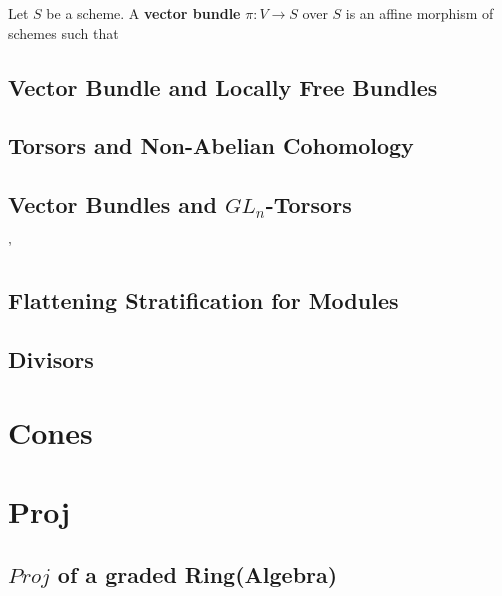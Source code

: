\documentclass[Total.tex]{subfiles}
\begin{document}
			\begin{Def}
				Let $S$ be a scheme. A \textbf{vector bundle} $\pi:V\rightarrow S$ over $S$ is an affine morphism of schemes such that
			\end{Def}
			\subsection{Vector Bundle and Locally Free Bundles}
			\subsection{Torsors and Non-Abelian Cohomology	}
			\subsection{Vector Bundles and $GL_n$-Torsors}'
			\subsection{Flattening Stratification for Modules}
			\subsection{Divisors}
		\section{Cones}
		\section{Proj}
			\subsection{$Proj$ of a graded Ring(Algebra)}
\end{document}
